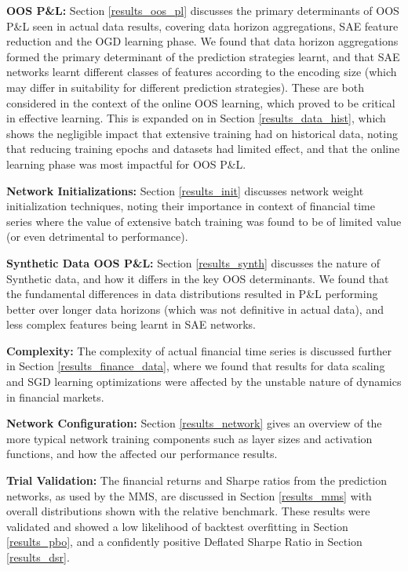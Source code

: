 \documentclass[a4paper,11pt,oneside]{article}
\theoremstyle{plain}
\theoremstyle{definition}
\begin{document}
	\textbf{OOS P\&L:} Section \ref{results_oos_pl} discusses the primary determinants of OOS P\&L seen in actual data results, covering data horizon aggregations, SAE feature reduction and the OGD learning phase. We found that data horizon aggregations formed the primary determinant of the prediction strategies learnt, and that SAE networks learnt different classes of features according to the encoding size (which may differ in suitability for different prediction strategies). These are both considered in the context of the online OOS learning, which proved to be critical in effective learning. This is expanded on in Section \ref{results_data_hist}, which shows the negligible impact that extensive training had on historical data, noting that reducing training epochs and datasets had limited effect, and that the online learning phase was most impactful for OOS P\&L. \newline
	
	\textbf{Network Initializations:} Section \ref{results_init} discusses network weight initialization techniques, noting their importance in context of financial time series where the value of extensive batch training was found to be of limited value (or even detrimental to performance).\newline
	
	\textbf{Synthetic Data OOS P\&L:} Section \ref{results_synth} discusses the nature of Synthetic data, and how it differs in the key OOS determinants. We found that the fundamental differences in data distributions resulted in P\&L performing better over longer data horizons (which was not definitive in actual data), and less complex features being learnt in SAE networks.\newline
	
	\textbf{Complexity:} The complexity of actual financial time series is discussed further in Section \ref{results_finance_data}, where we found that results for data scaling and SGD learning optimizations were affected by the unstable nature of dynamics in financial markets.\newline
	
	\textbf{Network Configuration:} Section \ref{results_network} gives an overview of the more typical network training components such as layer sizes and activation functions, and how the affected our performance results.\newline
	
	\textbf{Trial Validation:} The financial returns and Sharpe ratios from the prediction networks, as used by the MMS, are discussed in Section \ref{results_mms} with overall distributions shown with the relative benchmark. These results were validated and showed a low likelihood of backtest overfitting in Section \ref{results_pbo}, and a confidently positive Deflated Sharpe Ratio in Section \ref{results_dsr}.  \newline
	
\end{document}
